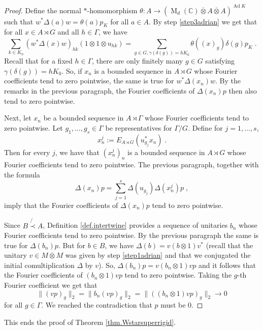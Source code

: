 \documentclass[a4paper,11pt]{amsart}
\numberwithin{equation}{section}
\begin{document}
\begin{proof}
Define the normal $*$-homomorphism $\theta : A {\rightarrow} ({\operatorname{M}}_d({\mathbb{C}}) {\mathbin{\overline{\otimes}}} A {\mathbin{\overline{\otimes}}} A)^{{\operatorname{Ad}} K}$ such that $w^* {\Delta}(a) w = \theta(a) p_K$ for all $a \in A$. By step \ref{step3adrian} we get that for all $x \in A \rtimes G$ and all $h \in \Gamma$, we have
$$\sum_{k \in K_0} (w^* {\Delta}(x) w)_{hk} (1 {\otimes} 1 {\otimes} u_{hk}) = \sum_{g \in G, \gamma(\delta(g)) = h K_0} \theta((x)_g) \delta(g) p_K \; .$$
Recall that for a fixed $h \in \Gamma$, there are only finitely many $g \in G$ satisfying $\gamma(\delta(g)) = h K_0$. So, if $x_n$ is a bounded sequence in $A \rtimes G$ whose Fourier coefficients tend to zero pointwise, the same is true for $w^* {\Delta}(x_n) w$. By the remarks in the previous paragraph, the Fourier coefficients of ${\Delta}(x_n) p$ then also tend to zero pointwise.

Next, let $x_n$ be a bounded sequence in $A \rtimes \Gamma$ whose Fourier coefficients tend to zero pointwise. Let $g_1,\ldots,g_s \in \Gamma$ be representatives for $\Gamma/G$. Define for $j =1,\ldots,s$,
$$x^j_n := E_{A \rtimes G}(u_{g_j}^* x_n) \; .$$
Then for every $j$, we have that $(x^j_n)_n$ is a bounded sequence in $A \rtimes G$ whose Fourier coefficients tend to zero pointwise. The previous paragraph, together with the formula
$${\Delta}(x_n) p = \sum_{j=1}^s {\Delta}(u_{g_j}) {\Delta}(x^j_n) p \; ,$$
imply that the Fourier coefficients of ${\Delta}(x_n) p$ tend to zero pointwise.

Since $B \not{\prec} A$, Definition \ref{def.intertwine} provides a sequence of unitaries $b_n$ whose Fourier coefficients tend to zero pointwise. By the previous paragraph the same is true for ${\Delta}(b_n) p$. But for $b \in B$, we have ${\Delta}(b) = v(b {\otimes} 1)v^*$ (recall that the unitary $v \in M {\mathbin{\overline{\otimes}}} M$ was given by step \ref{step1adrian} and that we conjugated the initial comultiplication ${\Delta}$ by $v$).
So, ${\Delta}(b_n)p = v(b_n {\otimes} 1)vp$ and it follows that the Fourier coefficients of $(b_n {\otimes} 1)vp$ tend to zero pointwise. Taking the $g$-th Fourier coefficient we get that
$$\|(vp)_g\|_2 = \|b_n (vp)_g\|_2 = \|((b_n {\otimes} 1)v p)_g\|_2 {\rightarrow} 0$$
for all $g \in \Gamma$. We reached the contradiction that $p$ must be $0$.
\end{proof}
This ends the proof of Theorem \ref{thm.Wstarsuperrigid}.\hfill\qedsymbol
\end{document}
